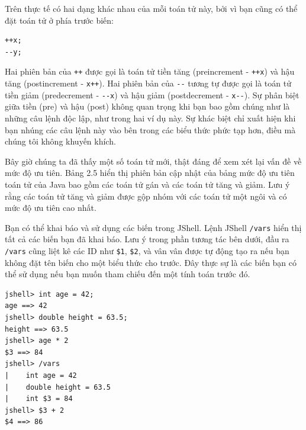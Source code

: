 Trên thực tế có hai dạng khác nhau của mỗi toán tử này, bởi vì bạn cũng
có thể đặt toán tử ở phía trước biến:

\begin{verbatim}
++x;
--y;
\end{verbatim}

Hai phiên bản của \texttt{++} được gọi là toán tử tiền tăng
(preincrement - \texttt{++x}) và hậu tăng (postincrement -
\texttt{x++}). Hai phiên bản của \texttt{-\/-} tương tự được gọi là toán
tử tiền giảm (predecrement - \texttt{-\/-x}) và hậu giảm (postdecrement
- \texttt{x-\/-}). Sự phân biệt giữa tiền (pre) và hậu (post) không quan
trọng khi bạn bao gồm chúng như là những câu lệnh độc lập, như trong hai
ví dụ này. Sự khác biệt chỉ xuất hiện khi bạn nhúng các câu lệnh này vào
bên trong các biểu thức phức tạp hơn, điều mà chúng tôi không khuyến
khích.

Bây giờ chúng ta đã thấy một số toán tử mới, thật đáng để xem xét lại
vấn đề về mức độ ưu tiên. Bảng 2.5 hiển thị phiên bản cập nhật của bảng
mức độ ưu tiên toán tử của Java bao gồm các toán tử gán và các toán tử
tăng và giảm. Lưu ý rằng các toán tử tăng và giảm được gộp nhóm với các
toán tử một ngôi và có mức độ ưu tiên cao nhất.

Bạn có thể khai báo và sử dụng các biến trong JShell. Lệnh JShell
\texttt{/vars} hiển thị tất cả các biến bạn đã khai báo. Lưu ý trong
phần tương tác bên dưới, đầu ra \texttt{/vars} cũng liệt kê các ID như
\texttt{\$1}, \texttt{\$2}, và vân vân được tự động tạo ra nếu bạn không
đặt tên biến cho một biểu thức cho trước. Đây thực sự là các biến bạn có
thể sử dụng nếu bạn muốn tham chiếu đến một tính toán trước đó.

\begin{verbatim}
jshell> int age = 42; 
age ==> 42
jshell> double height = 63.5; 
height ==> 63.5
jshell> age * 2 
$3 ==> 84
jshell> /vars
|    int age = 42
|    double height = 63.5
|    int $3 = 84
jshell> $3 + 2 
$4 ==> 86
\end{verbatim}

